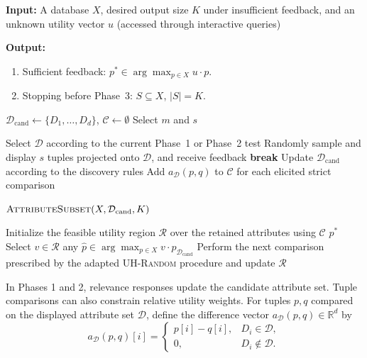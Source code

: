 \documentclass[conference]{IEEEtran}
\theoremstyle{definition}
\theoremstyle{plain}
\begin{document}
\begin{algorithm}[!t]
\caption{Overall Framework}
\label{alg:overall}
\flushleft
\textbf{Input:} A database $X$, desired output size $K$ under insufficient feedback, and an unknown utility vector $u$ (accessed through interactive queries)

\textbf{Output:}
\begin{enumerate}[label=(\arabic*)]
\item Sufficient feedback: $p^*\in\arg\max_{p\in X}u\cdot p$.
\item Stopping before Phase~3: $S\subseteq X$, $\lvert S\rvert=K$.
\end{enumerate}

\begin{algorithmic}[1]
\State $\mathcal{D}_{\mathrm{cand}}\gets\{D_1,\ldots,D_d\}$, $\mathcal{C}\gets\emptyset$ 
\State Select $m$ and $s$ 

    \State Select $\mathcal{D}$ according to the current Phase~1 or Phase~2 test
    \State Randomly sample and display $s$ tuples projected onto $\mathcal{D}$, and receive feedback
        \State \textbf{break}
    \EndIf
    \State Update $\mathcal{D}_{\mathrm{cand}}$ according to the discovery rules
    \State Add $a_{\mathcal{D}}(p,q)$ to $\mathcal{C}$ for each elicited strict comparison
\EndWhile

    \State \Return $\textsc{AttributeSubset}(X,\mathcal{D}_{\mathrm{cand}},K)$
\EndIf

\State Initialize the feasible utility region $\mathcal{R}$ over the retained attributes using $\mathcal{C}$
\Repeat
        \State \Return $p^*$
    \EndIf
        \State Select $v\in\mathcal{R}$
        \State \Return any $\hat p\in\arg\max_{p\in X}v\cdot p_{\mathcal{D}_{\mathrm{cand}}}$
    \EndIf
    \State Perform the next comparison prescribed by the adapted \textsc{UH-Random} procedure and update $\mathcal{R}$
\end{algorithmic}
\end{algorithm}

In Phases 1 and 2, relevance responses update the candidate attribute set. Tuple comparisons can also constrain relative utility weights. For tuples $p,q$ compared on the displayed attribute set $\mathcal{D}$, define the difference vector $a_{\mathcal{D}}(p,q)\in\mathbb{R}^d$ by
\[
a_{\mathcal{D}}(p,q)[i]=
\begin{cases}
p[i]-q[i],&D_i\in\mathcal{D},\\
0,&D_i\notin\mathcal{D}.
\end{cases}
\]
\end{document}
